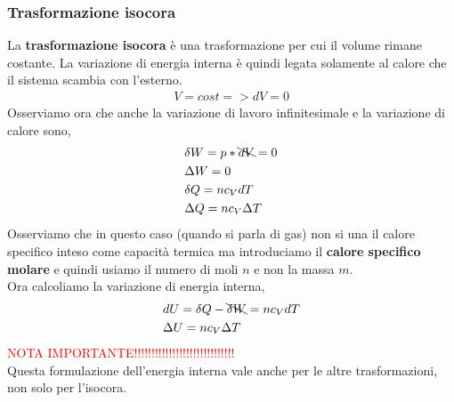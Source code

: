             \subsubsection{Trasformazione isocora}
                La \textbf{trasformazione isocora} è una trasformazione per cui il volume rimane costante. La variazione di energia interna è quindi legata solamente al calore che il sistema scambia con l'esterno.
                \begin{align*}
                    V = cost => dV = 0
                \end{align*}
                Osserviamo ora che anche la variazione di lavoro infinitesimale e la variazione di calore sono,
                \begin{align*}
                    &\delta W = p*\bcancel{dV} = 0\\
                    &\Delta W = 0\\
                    &\delta Q = nc_VdT\\
                    &\Delta Q = nc_V\Delta T
                \end{align*}
                Osserviamo che in questo caso (quando si parla di gas) non si una il calore specifico inteso come capacità termica ma introduciamo il \textbf{calore specifico molare} e quindi usiamo il numero di moli $n$ e non la massa $m$.\\
                Ora calcoliamo la variazione di energia interna,
                \begin{align*}
                    &dU=\delta Q - \bcancel{\delta W} = nc_VdT\\
                    &\Delta U = nc_V\Delta T
                \end{align*}
                \textcolor{Red}{NOTA IMPORTANTE!!!!!!!!!!!!!!!!!!!!!!!!!!!!!}\\
                Questa formulazione dell'energia interna vale anche per le altre trasformazioni, non solo per l'isocora.

